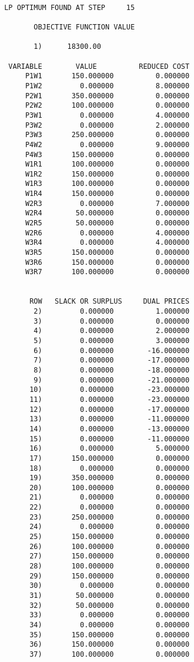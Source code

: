 \documentclass[12pt]{report}
\begin{document}
\begin{verbatim}
 
 LP OPTIMUM FOUND AT STEP     15

        OBJECTIVE FUNCTION VALUE

        1)      18300.00

  VARIABLE        VALUE          REDUCED COST
      P1W1       150.000000          0.000000
      P1W2         0.000000          8.000000
      P2W1       350.000000          0.000000
      P2W2       100.000000          0.000000
      P3W1         0.000000          4.000000
      P3W2         0.000000          2.000000
      P3W3       250.000000          0.000000
      P4W2         0.000000          9.000000
      P4W3       150.000000          0.000000
      W1R1       100.000000          0.000000
      W1R2       150.000000          0.000000
      W1R3       100.000000          0.000000
      W1R4       150.000000          0.000000
      W2R3         0.000000          7.000000
      W2R4        50.000000          0.000000
      W2R5        50.000000          0.000000
      W2R6         0.000000          4.000000
      W3R4         0.000000          4.000000
      W3R5       150.000000          0.000000
      W3R6       150.000000          0.000000
      W3R7       100.000000          0.000000


       ROW   SLACK OR SURPLUS     DUAL PRICES
        2)         0.000000          1.000000
        3)         0.000000          0.000000
        4)         0.000000          2.000000
        5)         0.000000          3.000000
        6)         0.000000        -16.000000
        7)         0.000000        -17.000000
        8)         0.000000        -18.000000
        9)         0.000000        -21.000000
       10)         0.000000        -23.000000
       11)         0.000000        -23.000000
       12)         0.000000        -17.000000
       13)         0.000000        -11.000000
       14)         0.000000        -13.000000
       15)         0.000000        -11.000000
       16)         0.000000          5.000000
       17)       150.000000          0.000000
       18)         0.000000          0.000000
       19)       350.000000          0.000000
       20)       100.000000          0.000000
       21)         0.000000          0.000000
       22)         0.000000          0.000000
       23)       250.000000          0.000000
       24)         0.000000          0.000000
       25)       150.000000          0.000000
       26)       100.000000          0.000000
       27)       150.000000          0.000000
       28)       100.000000          0.000000
       29)       150.000000          0.000000
       30)         0.000000          0.000000
       31)        50.000000          0.000000
       32)        50.000000          0.000000
       33)         0.000000          0.000000
       34)         0.000000          0.000000
       35)       150.000000          0.000000
       36)       150.000000          0.000000
       37)       100.000000          0.000000


\end{verbatim}
\end{document}
